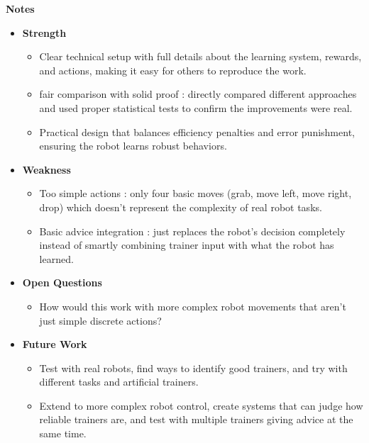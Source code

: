 \documentclass[report.tex]{subfiles}
\begin{document}
\noindent\textbf{Notes}
\begin{itemize}
    \item \noindent\textbf {Strength}
    \begin{itemize}
        \item Clear technical setup with full details about the learning system, rewards, and actions, making it easy for others to reproduce the work. 
        \item fair comparison with solid proof  : directly compared different approaches and used proper statistical tests to confirm the improvements were real. 
        \item Practical design that balances efficiency penalties and error punishment, ensuring the robot learns robust behaviors. 
    \end{itemize}
    
    \item \noindent\textbf{Weakness}
    \begin{itemize}
        \item Too simple actions : only four basic moves (grab, move left, move right, drop) which doesn't represent the complexity of real robot tasks. 
        \item Basic advice integration : just replaces the robot's decision completely instead of smartly combining trainer input with what the robot has learned. 
    \end{itemize}
\end{itemize}

\begin{itemize}
    \item \noindent\textbf {Open Questions}
    \begin{itemize}
        \item     How would this work with more complex robot movements that aren't just simple discrete actions? 

    \end{itemize}
    
    \item \noindent\textbf{Future Work}
    \begin{itemize}
        \item Test with real robots, find ways to identify good trainers, and try with different tasks and artificial trainers. 
        \item Extend to more complex robot control, create systems that can judge how reliable trainers are, and test with multiple trainers giving advice at the same time. 
        
    \end{itemize}
\end{itemize}
\end{document}
